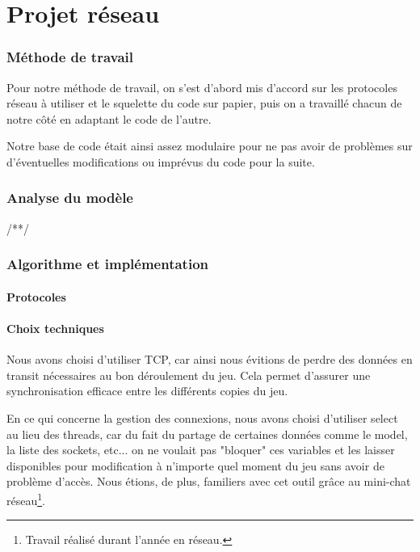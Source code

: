 \documentclass[a4paper]{article}
\begin{document}
\newpage
\part{Projet réseau}

	\section{Méthode de travail}

	Pour notre méthode de travail, on s'est d'abord mis d'accord sur les protocoles réseau à utiliser et le squelette du code sur papier, puis on a travaillé chacun de notre côté en adaptant le code de l'autre.

	Notre base de code était ainsi assez modulaire pour ne pas avoir de problèmes sur d'éventuelles modifications ou imprévus du code pour la suite.

	\section{Analyse du modèle}

	/**/
	
	\textunderscore
	
	\section{Algorithme et implémentation}
		\subsection{Protocoles}


		\subsection{Choix techniques}
		Nous avons choisi d'utiliser TCP, car ainsi nous évitions de perdre des données en transit nécessaires au bon déroulement du jeu. Cela permet d'assurer une synchronisation efficace entre les différents copies du jeu.

		En ce qui concerne la gestion des connexions, nous avons choisi d'utiliser select au lieu des threads, car du fait du partage de certaines données comme le model, la liste des sockets, etc... on ne voulait pas "bloquer" ces variables et les laisser disponibles pour modification à n'importe quel moment du jeu sans avoir de problème d'accès. Nous étions, de plus, familiers avec cet outil grâce au mini-chat réseau\footnote{Travail réalisé durant l'année en réseau.}.
\end{document}
